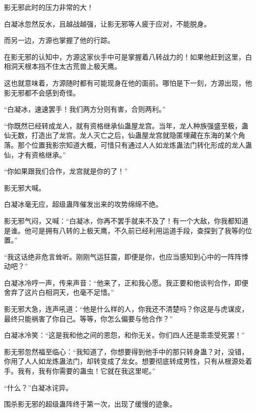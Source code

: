 \begin{this_body}
影无邪此时的压力非常的大！

白凝冰忽然反水，且越战越强，让影无邪等人疲于应对，不能脱身。

而另一边，方源也掌握了他的行踪。

在影无邪的认知中，方源这家伙手中可是掌握着八转战力的！如果他赶到这里，白相洞天根本挡不住太古荒兽上极天鹰。

这也就意味着，方源随时都有可能现身在他的面前。哪怕是下一刻，方源出现，他影无邪都不会感到奇怪。

“白凝冰，速速罢手！我们两方分则有害，合则两利。”

“你既然已经转成龙人，就有资格继承仙蛊屋龙宫。当年，龙人种族强盛至极，蛊仙无数，打造出了龙宫。龙人灭亡之后，仙蛊屋龙宫就隐匿埋藏在东海的某个角落。那个位置我影宗知道大概，可惜只有通过人人如龙炼蛊法门转化形成的龙人蛊仙，才有资格继承。”

“你如果跟我们合作，龙宫就是你的了！”

影无邪大喊。

白凝冰毫无应，超级蛊阵催发出来的攻势绵绵不绝。

影无邪气闷，又喊：“白凝冰，你再不罢手就来不及了！有一个大敌，你我都知道是谁。他可是拥有八转的上极天鹰，不久前已经利用运道手段，查探到了我等的位置。”

“我这话绝非危言耸听。刚刚气运狂震，即便是你，也应当感知到心中的一阵阵悸动吧？”

白凝冰冷哼一声，传来声音：“他来了，正和我心愿。我正要和他谈判合作，即便舍弃了这片白相洞天，也毫不足惜。”

影无邪大急，连声吼道：“他是什么样的人，你我还不清楚吗？你这是与虎谋皮，最终只能祸害了你自己。等等，你怎么偏要与他合作？”

白凝冰冷笑：“这是我和他之间的恩怨，和你无关。你们四人还是乖乖受死罢！”

影无邪忽然福至临心：“我知道了，你想要得到他手中的那只转身蛊？对，没错，你用了人人如龙炼蛊法门，却转变成了龙女。想要彻底转成男性，只有从根源处着手。我有，我有你需要的蛊虫！它就在我这里呢。”

“什么？”白凝冰诧异。

围杀影无邪的超级蛊阵终于第一次，出现了缓慢的迹象。

\end{this_body}

